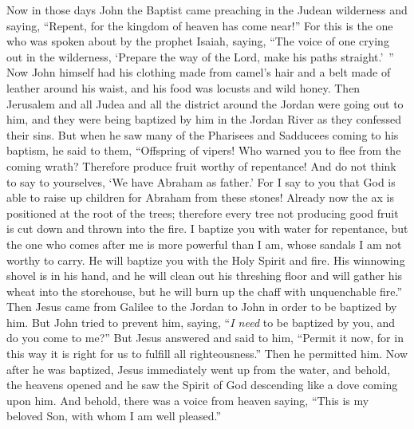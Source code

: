 \begin{biblechapter} %
 Now in those days John the Baptist came preaching in the Judean wilderness
\verse and saying, “Repent, for the kingdom of heaven has come near!”
\verse For this is the one who was spoken about by the prophet Isaiah, saying, “The voice of one crying out in the wilderness, 
‘Prepare the way of the Lord, 
make his paths straight.’ ”
\verse Now John himself had his clothing made from camel’s hair and a belt made of leather around his waist, and his food was locusts and wild honey.
\verse Then Jerusalem and all Judea and all the district around the Jordan were going out to him,
\verse and they were being baptized by him in the Jordan River as they confessed their sins.
\verse But when he saw many of the Pharisees and Sadducees coming to his baptism, he said to them, “Offspring of vipers! Who warned you to flee from the coming wrath?
\verse Therefore produce fruit worthy of repentance!
\verse And do not think to say to yourselves, ‘We have Abraham as father.’ For I say to you that God is able to raise up children for Abraham from these stones!
\verse Already now the ax is positioned at the root of the trees; therefore every tree not producing good fruit is cut down and thrown into the fire.
\verse I baptize you with water for repentance, but the one who comes after me is more powerful than I am, whose sandals I am not worthy to carry. He will baptize you with the Holy Spirit and fire.
\verse His winnowing shovel is in his hand, and he will clean out his threshing floor and will gather his wheat into the storehouse, but he will burn up the chaff with unquenchable fire.”
 Then Jesus came from Galilee to the Jordan to John in order to be baptized by him.
\verse But John tried to prevent him, saying, “\textit{I need} to be baptized by you, and do you come to me?”
\verse But Jesus answered and said to him, “Permit it now, for in this way it is right for us to fulfill all righteousness.” Then he permitted him.
\verse Now after he was baptized, Jesus immediately went up from the water, and behold, the heavens opened and he saw the Spirit of God descending like a dove coming upon him.
\verse And behold, there was a voice from heaven saying, “This is my beloved Son, with whom I am well pleased.”
\end{biblechapter}

